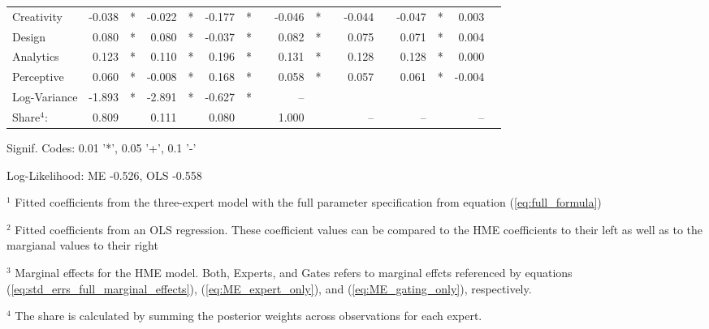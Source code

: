 \documentclass[12pt]{article}
\begin{document}
\begin{landscape}
\begin{table}
\begin{threeparttable}
\begin{tabular}[l]{l r l r l r l c r l c r l r l r l}
Creativity      & -0.038 & *      & -0.022 & *      & -0.177 & *      && -0.046 & *     && -0.044 &          & -0.047 & *        &  0.003 &        \\
Design          &  0.080 & *      &  0.080 & *      & -0.037 & *      &&  0.082 & *     &&  0.075 &          &  0.071 & *        &  0.004 &        \\
Analytics       &  0.123 & *      &  0.110 & *      &  0.196 & *      &&  0.131 & *     &&  0.128 &          &  0.128 & *        &  0.000 &        \\
Perceptive      &  0.060 & *      & -0.008 & *      &  0.168 & *      &&  0.058 & *     &&  0.057 &          &  0.061 & *        & -0.004 &        \\
Log-Variance    & -1.893 & *      & -2.891 & *      & -0.627 & *      &&  --    &       &&  &          &  &          &  &        \\
\cmidrule(l){2-3} \cmidrule(l){4-5} \cmidrule(l){6-7} \cmidrule(l){9-10} \cmidrule(l){12-13} \cmidrule(l){14-15} \cmidrule(l){16-17}
Share$^{4}$:          & 0.809  &        & 0.111  &      & 0.080 &           &&  1.000 &       &&  --    &          &  --    &          &  --    &        \\
\cmidrule{1-17}
      \end{tabular}

      \begin{tablenotes}
        \item Signif. Codes: 0.01 '*', 0.05 '+', 0.1 '-'
        \item Log-Likelihood: ME -0.526, OLS -0.558
        \item $^{1}$ Fitted coefficients from the three-expert model with the full parameter specification from equation (\ref{eq:full_formula})
        \item $^{2}$ Fitted coefficients from an OLS regression. These coefficient values can be compared to the HME coefficients to their left as well as to the margianal values to their right
        \item $^{3}$ Marginal effects for the HME model. Both, Experts, and Gates refers to marginal effcts referenced by equations (\ref{eq:std_errs_full_marginal_effects}), (\ref{eq:ME_expert_only}), and (\ref{eq:ME_gating_only}), respectively.
        \item $^{4}$ The share is calculated by summing the posterior weights across observations for each expert.

      \end{tablenotes} \label{tbl:3W_full_regressions_results}


    \end{threeparttable}

\end{table}
\end{landscape}
\end{document}
